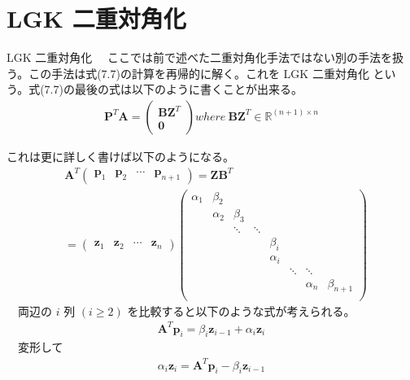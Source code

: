 \documentclass[dvipdfmx,10pt,presentation]{beamer}
\begin{document}
\section{LGK 二重対角化}
\label{sec:org1866eb1}
\begin{frame}[label={sec:orga4042a6}]{LGK 二重対角化}
　ここでは前で述べた二重対角化手法ではない別の手法を扱う。この手法は式(7.7)の計算を再帰的に解く。これを \alert{LGK 二重対角化} という。式(7.7)の最後の式は以下のように書くことが出来る。\\
\begin{align*}
\bm{P}^T\bm{A}=
\begin{pmatrix}
\bm{B}\bm{Z}^T\\
\bm{0}
\end{pmatrix}  where \ \bm{B}\bm{Z}^T \in \mathbb{R}^{(n+1)\times n}
\end{align*}
\end{frame}
\begin{frame}[label={sec:org7f6acf5}]{}
これは更に詳しく書けば以下のようになる。\\
\begin{align*}
&\bm{A}^T
\begin{pmatrix}
\bm{p}_1& \bm{p}_2&\cdots & \bm{p}_{n+1}
\end{pmatrix}
= \bm{Z} \bm{B}^T  \\
&= 
\begin{pmatrix}
\bm{z}_1 & \bm{z}_2 &\cdots &\bm{z}_n
\end{pmatrix}
\begin{pmatrix}
\alpha_1& \beta_2& & & & &&\\
&\alpha_2& \beta_3&  & &&&\\
&&\ddots& \ddots &   &&&\\
&&&& \beta_i &&\\
&&&& \alpha_i && \\
&&&&&\ddots & \ddots & \\ 
&&&&&& \alpha_n & \beta_{n+1}   \\
\end{pmatrix}
\end{align*}
　両辺の \(i\) 列 \((i\geq 2)\) を比較すると以下のような式が考えられる。\\
\begin{align*}
\bm{A}^T\bm{p}_i = \beta_i\bm{z}_{i-1} + \alpha_i \bm{z}_i
\end{align*}
　変形して\\
\begin{align*}
\alpha_i\bm{z}_i=\bm{A}^T\bm{p}_i - \beta_i\bm{z}_{i-1} \tag{7.9}
\end{align*}
\end{frame}
\end{document}

